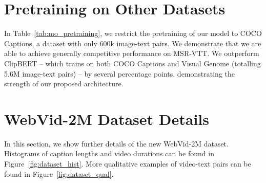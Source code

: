 \documentclass[10pt,twocolumn,letterpaper]{article}
\begin{document}
\section{Pretraining on Other Datasets}
In Table~\ref{tab:mo_pretraining}, we restrict the pretraining of our model to COCO Captions, a dataset with only 600k image-text pairs. We demonstrate that we are able to achieve generally competitive performance on MSR-VTT. We outperform ClipBERT -- which trains on both COCO Captions and Visual Genome (totalling 5.6M image-text pairs) -- by several percentage points, demonstrating the strength of our proposed architecture.
\begin{table}\centering
\caption{\textbf{Pretraining sources extended:} The effect of different  other pretraining sources. We use 4 frames per video when finetuning. Results are presented on the 1K-A MSR-VTT test set for text-video retrieval.}
\label{tab:mo_pretraining}
\end{table} 

\section{WebVid-2M Dataset Details}
In this section, we show further details of the new WebVid-2M dataset. Histograms of caption lengths and video durations can be found in Figure~\ref{fig:dataset_hist}. More qualitative examples of video-text pairs can be found in Figure~\ref{fig:dataset_qual}.
\end{document}
